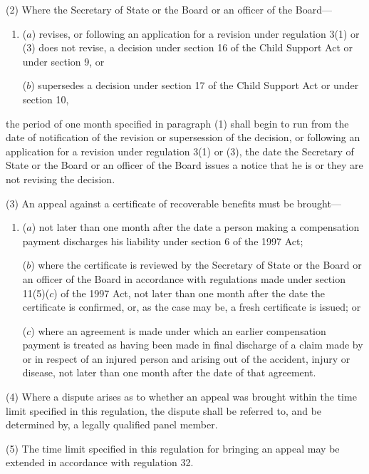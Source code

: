 \documentclass[12pt,a4paper]{article}
\begin{document}
(2) Where the Secretary of State
or the Board or an officer of the Board—  %
\begin{enumerate}\item[]
($a$) revises, or following an application for a revision under regulation 3(1) or (3) does not revise, a decision under section 16 of the Child Support Act or under section 9, or

($b$) supersedes a decision under section 17 of the Child Support Act or under section 10,
\end{enumerate}
the period of one month specified in paragraph (1) shall begin to run from the date of notification of the revision or supersession of the decision, or following an application for a revision under regulation 3(1) or (3), the date the Secretary of State 
or the Board or an officer of the Board  %
issues a notice that he is 
or they are  %
not revising the decision.

(3) An appeal against a certificate of recoverable benefits must be brought—
\begin{enumerate}\item[]
($a$) not later than one month after the date a person making a compensation payment discharges his liability under section 6 of the 1997 Act;

($b$) where the certificate is reviewed by the Secretary of State 
or the Board or an officer of the Board  %
in accordance with regulations made under section 11(5)($c$) of the 1997 Act, not later than one month after the date the certificate is confirmed, or, as the case may be, a fresh certificate is issued; or

($c$) where an agreement is made under which an earlier compensation payment is treated as having been made in final discharge of a claim made by or in respect of an injured person and arising out of the accident, injury or disease, not later than one month after the date of that agreement.
\end{enumerate}

(4) Where a dispute arises as to whether an appeal was brought within the time limit specified in this regulation, the dispute shall be referred to, and be determined by, a legally qualified panel member.

(5) The time limit specified in this regulation for bringing an appeal may be extended in accordance with regulation 32.
\end{document}
